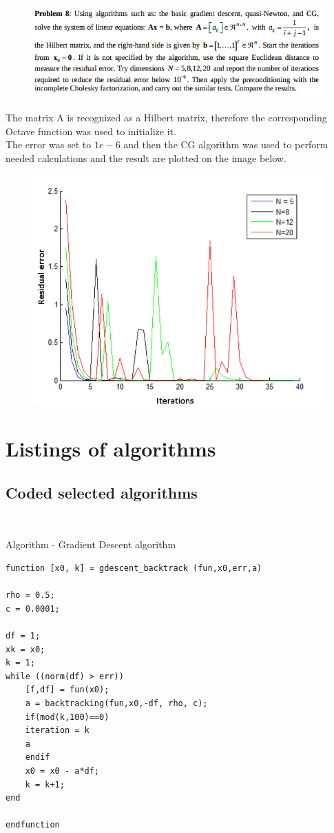 \documentclass[eng,openany]{mgr}
\begin{document}
\clearpage
\begin{figure}[h]
\centering
\includegraphics[width=0.7\linewidth]{screenshot017}
\label{fig:screenshot017}
\end{figure}

The matrix A is recognized as a Hilbert matrix, therefore the corresponding Octave function was used to initialize it.\\
The error was set to $1e-6$ and then the CG algorithm was used to perform needed calculations and the result are plotted on the image below.

\begin{figure}[h]
\centering
\includegraphics[width=0.7\linewidth]{screenshot020}
\label{fig:screenshot020}
\end{figure}





\clearpage
\chapter{Listings of algorithms}
\section{Coded selected algorithms}

\

Algorithm - Gradient Descent algorithm\\
\begin{lstlisting}
function [x0, k] = gdescent_backtrack (fun,x0,err,a)

rho = 0.5;
c = 0.0001;

df = 1;
xk = x0;
k = 1;
while ((norm(df) > err))
	[f,df] = fun(x0);
	a = backtracking(fun,x0,-df, rho, c);
	if(mod(k,100)==0) 
	iteration = k
	a 
	endif
	x0 = x0 - a*df;
	k = k+1;
end

endfunction
\end{lstlisting}
\end{document}
